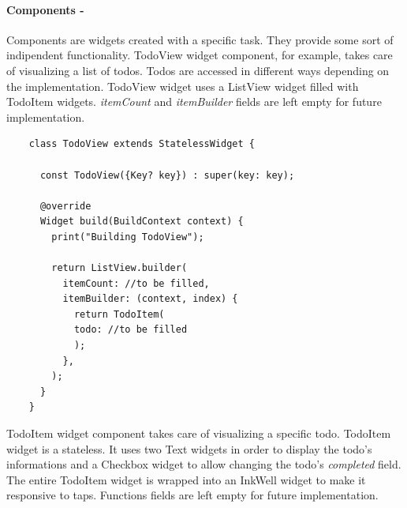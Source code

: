 	\paragraph{Components - } 
	\label{par:todo_app_components}
	Components are widgets created with a specific task. They provide some sort of indipendent functionality.
	TodoView widget component, for example, takes care of visualizing a list of todos. Todos are accessed in different ways depending on the implementation. TodoView widget uses a ListView widget filled with TodoItem widgets. \textit{itemCount} and \textit{itemBuilder} fields are left empty for future implementation.
\mbox{}
	\begin{code}
	 \mbox{}
			\label{code:2.7}
	\begin{verbatim}
	class TodoView extends StatelessWidget {
	
	  const TodoView({Key? key}) : super(key: key);
	
	  @override
	  Widget build(BuildContext context) {
	    print("Building TodoView");
	
	    return ListView.builder(
	      itemCount: //to be filled,
	      itemBuilder: (context, index) {
	        return TodoItem(
	        todo: //to be filled 
	        );
	      },
	    );
	  }
	}
	\end{verbatim}
	\end{code}

TodoItem widget component takes care of visualizing a specific todo. TodoItem widget is a stateless. It uses two Text widgets in order to display the todo's informations and a Checkbox widget to allow changing the todo’s \textit{completed} field. The entire TodoItem widget is wrapped into an InkWell widget to make it responsive to taps. Functions fields are left empty for future implementation.
	
